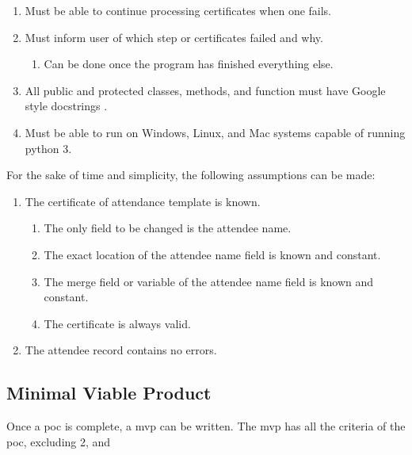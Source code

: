 \documentclass[11pt]{article}
\begin{document}
\begin{enumerate}
    \item Must be able to continue processing certificates when one fails.
    \item Must inform \gls{user} of which step or certificates failed and why.
    \begin{enumerate}
        \item Can be done once the program has finished everything else.
    \end{enumerate}
    \item All public and protected \gls{class}es, methods, and function must have Google style \glspl{docstring} \cite{google-docstring}.
    \item Must be able to run on Windows, Linux, and Mac systems capable of running \Gls{python} 3.
\end{enumerate}

\noindent
For the sake of time and simplicity, the following assumptions can be made:

\begin{enumerate}
    \item The certificate of attendance template is known.
    \begin{enumerate}
        \item The only field to be changed is the attendee name.
        \item The exact location of the attendee name field is known and constant.
        \item The merge field or variable of the attendee name field is known and constant.
        \item The certificate is always valid.
    \end{enumerate}
    \item The attendee record contains no errors.
\end{enumerate}

\subsection{Minimal Viable Product}

Once a \gls{poc} is complete, a \acrfull{mvp} can be written. The \acrshort{mvp} has all the criteria of the \gls{poc}, excluding 2, and
\end{document}
